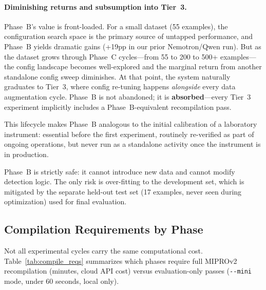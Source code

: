 \documentclass[11pt]{article}
\begin{document}
\paragraph{Diminishing returns and subsumption into Tier~3.}

Phase~B's value is front-loaded. For a small dataset (55 examples), the
configuration search space is the primary source of untapped performance,
and Phase~B yields dramatic gains (+19pp in our prior Nemotron/Qwen run). But as the dataset
grows through Phase~C cycles---from 55 to 200 to 500+ examples---the
config landscape becomes well-explored and the marginal return from
another standalone config sweep diminishes. At that point, the system
naturally graduates to Tier~3, where config re-tuning happens
\emph{alongside} every data augmentation cycle. Phase~B is not
abandoned; it is \textbf{absorbed}---every Tier~3 experiment implicitly
includes a Phase~B-equivalent recompilation pass.

This lifecycle makes Phase~B analogous to the initial calibration of a
laboratory instrument: essential before the first experiment, routinely
re-verified as part of ongoing operations, but never run as a standalone
activity once the instrument is in production.

Phase~B is strictly safe: it cannot introduce new data and cannot modify
detection logic. The only risk is over-fitting to the development set,
which is mitigated by the separate held-out test set (17 examples,
never seen during optimization) used for final evaluation.

\subsection{Compilation Requirements by Phase}

Not all experimental cycles carry the same computational cost.
Table~\ref{tab:compile_reqs} summarizes which phases require full
MIPROv2 recompilation (minutes, cloud API cost) versus evaluation-only
passes (\texttt{-{}-mini} mode, under 60 seconds, local only).
\end{document}
